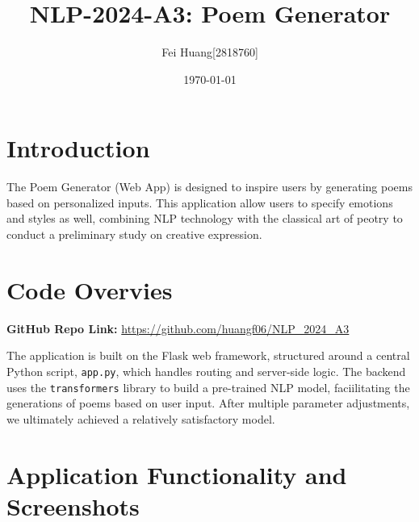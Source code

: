 \documentclass[11pt]{article}
\title{NLP-2024-A3: Poem Generator}
\author{Fei Huang[2818760]}
\date{\today}
\begin{document}
\maketitle

\section{Introduction}

The Poem Generator (Web App) is designed to inspire users by generating poems based on personalized inputs. This application allow users to specify emotions and styles as well, combining NLP technology with the classical art of peotry to conduct a preliminary study on creative expression.

\section{Code Overvies}

\textbf{GitHub Repo Link:} \url{https://github.com/huangf06/NLP_2024_A3}

The application is built on the Flask web framework, structured around a central Python script, \texttt{app.py}, which handles routing and server-side logic. The backend uses the \texttt{transformers} library to build a pre-trained NLP model, faciilitating the generations of poems based on user input. After multiple parameter adjustments, we ultimately achieved a relatively satisfactory model.

\section{Application Functionality and Screenshots}
\end{document}
